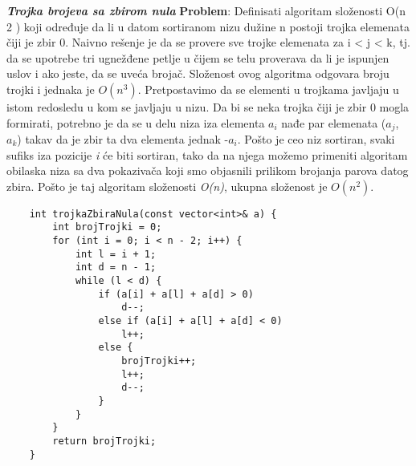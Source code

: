 \documentclass{article}
\begin{document}
\vspace{0.1cm}
\textit{\textbf{Trojka brojeva sa zbirom nula}}
\vspace{0.1cm}\newline
\textbf{Problem}: Definisati algoritam složenosti O(n 2 ) koji određuje da li u datom
sortiranom nizu dužine n postoji trojka elemenata čiji je zbir 0.
\newline
Naivno rešenje je da se provere sve trojke elemenata za i < j < k,
tj. da se upotrebe tri ugnežđene petlje u čijem se telu proverava da li je
ispunjen uslov i ako jeste, da se uveća brojač. Složenost ovog algoritma
odgovara broju trojki i jednaka je $O(n^3)$.
Pretpostavimo da se elementi u trojkama javljaju u istom redosledu u kom se
javljaju u nizu. Da bi se neka trojka čiji je zbir 0 mogla
formirati, potrebno je da se u delu niza iza elementa $a_i$ nađe par elemenata
($a_j$, $a_k$) takav da je zbir ta dva elementa jednak -$a_i$.
Pošto je ceo niz sortiran, svaki sufiks iza pozicije \textit{i} će biti sortiran, tako da na
njega možemo primeniti algoritam obilaska niza sa dva pokazivača koji smo
objasnili prilikom brojanja parova datog zbira. Pošto je taj algoritam složenosti
\textit{O(n)}, ukupna složenost je $O(n^2)$.
\begin{lstlisting}
    int trojkaZbiraNula(const vector<int>& a) {
        int brojTrojki = 0;
        for (int i = 0; i < n - 2; i++) {
            int l = i + 1;
            int d = n - 1;
            while (l < d) {
                if (a[i] + a[l] + a[d] > 0)
                    d--;
                else if (a[i] + a[l] + a[d] < 0)
                    l++;
                else {
                    brojTrojki++;
                    l++;
                    d--;
                }
            }
        }
        return brojTrojki;
    }
\end{lstlisting}
\end{document}
